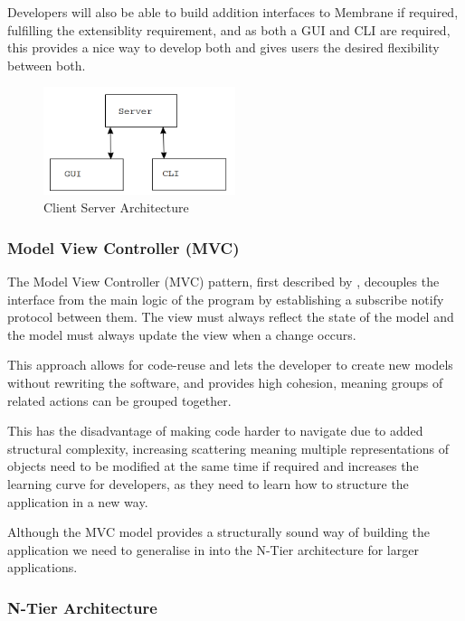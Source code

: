 \documentclass[11pt, a4paper, twocolumn, twoside]{report}
\begin{document}
Developers will also be able to build addition interfaces to Membrane if required, fulfilling the extensiblity requirement, and as both a GUI and CLI are required, this provides a nice way to develop both and gives users the desired flexibility between both.

\begin{figure}[t]
 \includegraphics[width=0.5\textwidth]{client-server-model}
 \caption{Client Server Architecture}
 \label{fig:client-server}
\end{figure}

\subsubsection{Model View Controller (MVC)}

The Model View Controller (MVC) pattern, first described by \cite{krasner1988cookbook}, decouples the interface from the main logic of the program by establishing a subscribe notify protocol between them. The view must always reflect the state of the model and the model must always update the view when a change occurs.

This approach allows for code-reuse and lets the developer to create new models without rewriting the software, and provides high cohesion, meaning groups of related actions can be grouped together.

This has the disadvantage of making code harder to navigate due to added structural complexity, increasing scattering meaning multiple representations of objects need to be modified at the same time if required and increases the learning curve for developers, as they need to learn how to structure the application in a new way.

Although the MVC model provides a structurally sound way of building the application we need to generalise in into the N-Tier architecture for larger applications.

\subsubsection{N-Tier Architecture}
\end{document}
